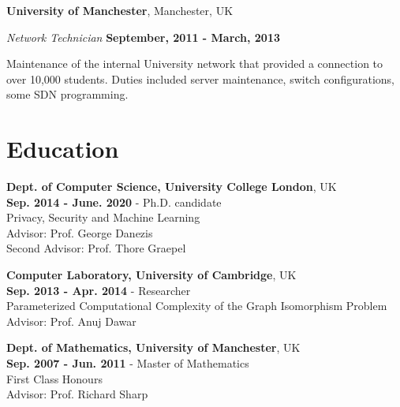 \documentclass[margin,line]{res}
\begin{document}
\begin{resume}
{\bf University of Manchester}, Manchester, UK

\vspace{-.3cm}
{\em Network Technician} \hfill {\bf September, 2011 - March, 2013}

Maintenance of the internal University network that provided a
connection to over 10,000 students. Duties included server
maintenance, switch configurations, some SDN programming.




\section{\sc Education}
{\bf Dept. of Computer Science, University College London}, UK\\
{\bf Sep. 2014 - June. 2020} - Ph.D. candidate\\
Privacy, Security and Machine Learning\\
Advisor:  Prof. George Danezis\\
Second Advisor: Prof. Thore Graepel

{\bf Computer Laboratory, University of Cambridge}, UK\\
{\bf Sep. 2013 - Apr. 2014} - Researcher\\
Parameterized Computational Complexity of the Graph Isomorphism Problem\\
Advisor: Prof. Anuj Dawar

{\bf Dept. of Mathematics, University of Manchester}, UK\\
{\bf Sep. 2007 - Jun. 2011} - Master of Mathematics\\
First Class Honours\\
Advisor: Prof. Richard Sharp










\end{resume}
\end{document}
